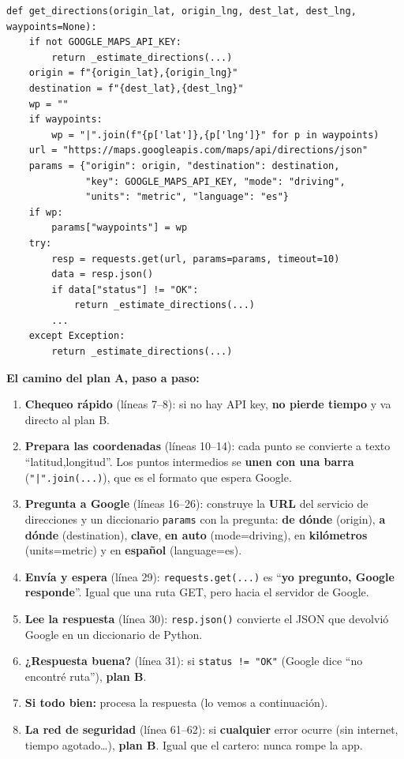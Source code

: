 \documentclass[11pt,a4paper]{article}
\begin{document}
\begin{lstlisting}
def get_directions(origin_lat, origin_lng, dest_lat, dest_lng, waypoints=None):
    if not GOOGLE_MAPS_API_KEY:
        return _estimate_directions(...)
    origin = f"{origin_lat},{origin_lng}"
    destination = f"{dest_lat},{dest_lng}"
    wp = ""
    if waypoints:
        wp = "|".join(f"{p['lat']},{p['lng']}" for p in waypoints)
    url = "https://maps.googleapis.com/maps/api/directions/json"
    params = {"origin": origin, "destination": destination,
              "key": GOOGLE_MAPS_API_KEY, "mode": "driving",
              "units": "metric", "language": "es"}
    if wp:
        params["waypoints"] = wp
    try:
        resp = requests.get(url, params=params, timeout=10)
        data = resp.json()
        if data["status"] != "OK":
            return _estimate_directions(...)
        ...
    except Exception:
        return _estimate_directions(...)
\end{lstlisting}

\textbf{El camino del plan A, paso a paso:}

\begin{enumerate}
    \item \textbf{Chequeo rápido} (líneas 7--8): si no hay API key, \textbf{no pierde tiempo}
    y va directo al plan B.
    \item \textbf{Prepara las coordenadas} (líneas 10--14): cada punto se convierte a texto
    ``latitud,longitud''. Los puntos intermedios se \textbf{unen con una barra}
    (\texttt{"|".join(...)}), que es el formato que espera Google.
    \item \textbf{Pregunta a Google} (líneas 16--26): construye la \textbf{URL} del servicio
    de direcciones y un diccionario \texttt{params} con la pregunta: \textbf{de dónde}
    (origin), \textbf{a dónde} (destination), \textbf{clave}, \textbf{en auto} (mode=driving),
    en \textbf{kilómetros} (units=metric) y en \textbf{español} (language=es).
    \item \textbf{Envía y espera} (línea 29): \texttt{requests.get(...)} es ``\textbf{yo pregunto,
    Google responde}''. Igual que una ruta GET, pero hacia el servidor de Google.
    \item \textbf{Lee la respuesta} (línea 30): \texttt{resp.json()} convierte el JSON que
    devolvió Google en un diccionario de Python.
    \item \textbf{¿Respuesta buena?} (línea 31): si \texttt{status != "OK"} (Google dice
    ``no encontré ruta''), \textbf{plan B}.
    \item \textbf{Si todo bien:} procesa la respuesta (lo vemos a continuación).
    \item \textbf{La red de seguridad} (línea 61--62): si \textbf{cualquier} error ocurre
    (sin internet, tiempo agotado\dots), \textbf{plan B}. Igual que el cartero: nunca rompe la app.
\end{enumerate}
\end{document}
